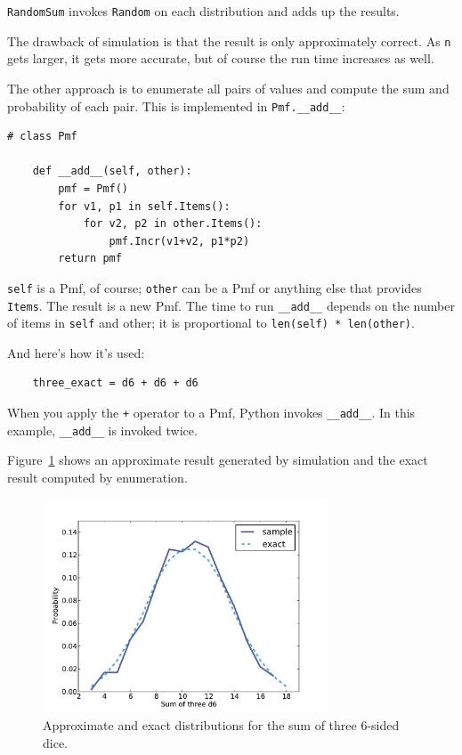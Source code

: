 \documentclass[12pt]{book}
\begin{document}
{\tt RandomSum} invokes {\tt Random} on each distribution and
adds up the results.

The drawback of simulation is that the result
is only approximately correct.  As \verb"n" gets larger, it gets
more accurate, but of course the run time increases as well.

The other approach is to enumerate all pairs of values and
compute the sum and probability of each pair.  This is implemented
in \verb"Pmf.__add__":

\begin{verbatim}
# class Pmf

    def __add__(self, other):
        pmf = Pmf()
        for v1, p1 in self.Items():
            for v2, p2 in other.Items():
                pmf.Incr(v1+v2, p1*p2)
        return pmf
\end{verbatim}

{\tt self} is a Pmf, of course; {\tt other} can be a Pmf or anything
else that provides {\tt Items}.  The result is a new Pmf.  The time to
run \verb"__add__" depends on the number of items in {\tt self} and
other; it is proportional to {\tt len(self) * len(other)}.

And here's how it's used:

\begin{verbatim}
    three_exact = d6 + d6 + d6
\end{verbatim}

When you apply the {\tt +} operator to a Pmf, Python invokes
\verb"__add__".  In this example, \verb"__add__" is invoked twice.

Figure~\ref{fig.dungeons1} shows an approximate result generated
by simulation and the exact result computed by enumeration.

\begin{figure}
\centerline{\includegraphics[height=2.5in]{figs/dungeons1.pdf}}
\caption{Approximate and exact distributions for the sum of
three 6-sided dice.}
\label{fig.dungeons1}
\end{figure}
\end{document}
